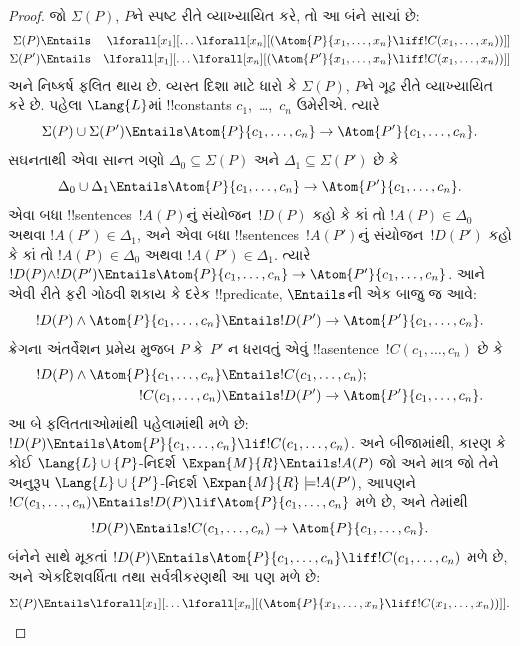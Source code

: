 \documentclass[../../../include/open-logic-section]{subfiles}
\begin{document}
\begin{proof}
જો $\Sigma(P)$, $P$ને સ્પષ્ટ રીતે વ્યાખ્યાયિત કરે, તો આ બંને સાચાં
છે:
\begin{align*}
  \Sigma(P) & \Entails & \lforall[x_1][\dots \lforall[x_n]
    [(\Atom{P}{x_1,\dots, x_n} \liff !C(x_1,\dots,x_n))]]\\
  \Sigma(P') & \Entails & \lforall[x_1][\dots \lforall[x_n]
    [(\Atom{P'}{x_1,\dots, x_n} \liff !C(x_1,\dots,x_n))]]
\end{align*}
અને નિષ્કર્ષ ફલિત થાય છે. વ્યસ્ત દિશા માટે ધારો કે $\Sigma(P)$,
$P$ને ગૂઢ રીતે વ્યાખ્યાયિત કરે છે. પહેલા $\Lang{L}$માં !!{constant}s
$c_1$,~\dots,~$c_n$ ઉમેરીએ. ત્યારે
\[
\Sigma(P) \cup \Sigma(P') \Entails
\Atom{P}{c_1, \dots, c_n} \to \Atom{P'}{c_1, \dots, c_n}.
\]
સઘનતાથી એવા સાન્ત ગણો $\Delta_0\subseteq\Sigma(P)$ અને
$\Delta_1\subseteq\Sigma(P')$ છે કે
\[
\Delta_0 \cup \Delta_1 \Entails
\Atom{P}{c_1, \dots, c_n} \to \Atom{P'}{c_1, \dots, c_n}.
\]
એવા બધા !!{sentence}s~$!A(P)$નું સંયોજન~$!D(P)$ કહો કે કાં તો
$!A(P)\in\Delta_0$ અથવા $!A(P')\in\Delta_1$, અને એવા બધા
!!{sentence}s~$!A(P')$નું સંયોજન~$!D(P')$ કહો કે કાં તો
$!A(P)\in\Delta_0$ અથવા $!A(P')\in\Delta_1$. ત્યારે
$!D(P)\land !D(P')\Entails\Atom{P}{c_1,\dots,c_n}\to
\Atom{P'}{c_1,\dots,c_n}$. આને એવી રીતે ફરી ગોઠવી શકાય કે દરેક
!!{predicate}, $\Entails$ની એક બાજુ જ આવે:
\[
!D(P) \land \Atom{P}{c_1, \dots, c_n} \Entails
!D(P') \to \Atom{P'}{c_1, \dots, c_n}.
\]
ક્રેગના અંતર્વેશન પ્રમેય મુજબ $P$ કે~$P'$ ન ધરાવતું એવું
!!a{sentence}~$!C(c_1,\dots,c_n)$ છે કે
\begin{align*}
  !D(P) \land \Atom{P}{c_1, \dots, c_n} & \Entails !C(c_1,\dots, c_n); \\
  !C(c_1,\dots, c_n) & \Entails !D(P') \to \Atom{P'}{c_1, \dots, c_n}.
\end{align*}
આ બે ફલિતતાઓમાંથી પહેલામાંથી મળે છે: $!D(P)\Entails
\Atom{P}{c_1,\dots,c_n}\lif !C(c_1,\dots,c_n)$. અને બીજામાંથી,
કારણ કે કોઈ $\Lang{L}\cup\{P\}$-નિદર્શ $\Expan{M}{R}\Entails
!A(P)$ જો અને માત્ર જો તેને અનુરૂપ $\Lang{L}\cup\{P'\}$-નિદર્શ
$\Expan{M}{R}\models !A(P')$, આપણને
$!C(c_1,\dots,c_n)\Entails !D(P)\lif\Atom{P}{c_1,\dots,c_n}$ મળે છે,
અને તેમાંથી
\[
!D(P) \Entails !C(c_1,\dots,c_n) \to \Atom{P}{c_1,\dots, c_n}.
\]
બંનેને સાથે મૂકતાં $!D(P)\Entails\Atom{P}{c_1,\dots,c_n}\liff
!C(c_1,\dots,c_n)$ મળે છે, અને એકદિશવર્ધિતા તથા સર્વત્રીકરણથી આ પણ
મળે છે:
\[
\Sigma(P) \Entails
\lforall[x_1][\dots\lforall[x_n][(\Atom{P}{x_1,\dots, x_n} \liff
    !C(x_1,\dots, x_n))]].
\]
\end{proof}
\end{document}
